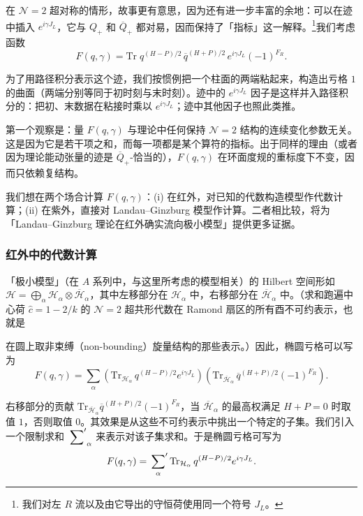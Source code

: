 在 $\mathcal{N}=2$ 超对称的情形，故事更有意思，因为还有进一步丰富的余地：可以在迹中插入 $e^{i\gamma J_L}$，它与 $Q_+$ 和 $\overline{Q}_+$ 都对易，因而保持了「指标」这一解释。\footnote{我们对左 $R$ 流以及由它导出的守恒荷使用同一个符号 $J_L$。}我们考虑函数
\[
  F(q,\gamma)=\mathrm{Tr}\;q^{(H-P)/2}\,\overline{q}^{(H+P)/2}\,
  e^{i\gamma J_L}(-1)^{F_R}.
\]

为了用路径积分表示这个迹，我们按惯例把一个柱面的两端粘起来，构造出亏格 $1$ 的曲面（两端分别等同于初时刻与末时刻）。迹中的 $e^{i\gamma J_L}$ 因子是这样并入路径积分的：把初、末数据在粘接时乘以 $e^{i\gamma J_L}$；迹中其他因子也照此类推。

第一个观察是：量 $F(q,\gamma)$ 与理论中任何保持 $\mathcal{N}=2$ 结构的连续变化参数无关。这是因为它是若干项之和，而每一项都是某个算符的指标。出于同样的理由（或者因为理论能动张量的迹是 $\overline{Q}_+$-恰当的），$F(q,\gamma)$ 在环面度规的重标度下不变，因而只依赖复结构。

我们想在两个场合计算 $F(q,\gamma)$：(i) 在红外，对已知的代数构造模型作代数计算；(ii) 在紫外，直接对 Landau--Ginzburg 模型作计算。二者相比较，将为「Landau--Ginzburg 理论在红外确实流向极小模型」提供更多证据。

\subsubsection{红外中的代数计算}

「极小模型」（在 $A$ 系列中，与这里所考虑的模型相关）的 Hilbert 空间形如 $\mathcal{H}=\bigoplus_\alpha\mathcal{H}_\alpha\otimes\overline{\mathcal{H}}_\alpha$，其中左移部分在 $\mathcal{H}_\alpha$ 中，右移部分在 $\overline{\mathcal{H}}_\alpha$ 中。（求和跑遍中心荷 $\widehat{c}=1-2/k$ 的 $\mathcal{N}=2$ 超共形代数在 Ramond 扇区的所有酉不可约表示，也就是


在圆上取非束缚（non-bounding）旋量结构的那些表示。）因此，椭圆亏格可以写为
\[
  F(q,\gamma)=\sum_\alpha
  \left(\mathrm{Tr}_{\mathcal{H}_\alpha}\,q^{(H-P)/2}e^{i\gamma J_L}\right)
  \left(\mathrm{Tr}_{\overline{\mathcal{H}}_\alpha}\,
  \overline{q}^{(H+P)/2}(-1)^{F_R}\right).
\]

右移部分的贡献 $\mathrm{Tr}_{\overline{\mathcal{H}}_\alpha}\overline{q}^{(H+P)/2}(-1)^{F_R}$，当 $\overline{\mathcal{H}}_\alpha$ 的最高权满足 $H+P=0$ 时取值 $1$，否则取值 $0$。其效果是从这些不可约表示中挑出一个特定的子集。我们引入一个限制求和 $\sideset{}{'}\sum_\alpha$ 来表示对该子集求和。于是椭圆亏格可写为
\[
  F(q,\gamma)=\sideset{}{'}\sum_{\alpha}
  \mathrm{Tr}_{\mathcal{H}_\alpha}\,q^{(H-P)/2}e^{i\gamma J_L}.
\]

